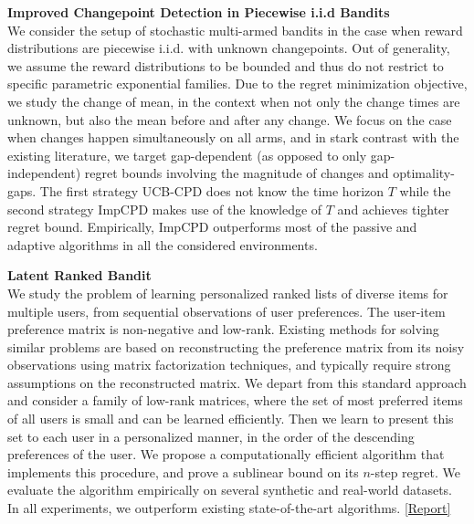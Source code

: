 \documentclass[margin,11pt]{res}
\begin{document}
\begin{resume}
\textbf{Improved Changepoint Detection in Piecewise i.i.d  Bandits}\\
We consider the setup of stochastic multi-armed bandits in the case when reward distributions are piecewise i.i.d. with unknown changepoints. Out of generality, we assume the reward distributions to be bounded and thus do not restrict to specific parametric exponential families. Due to the regret minimization objective, we study the change of mean, in the context when not only the change times are unknown, but also the mean before and after any change. We focus on the case when changes happen simultaneously on all arms, and in stark contrast with the existing literature, we target gap-dependent (as opposed to only gap-independent) regret bounds involving the magnitude of changes and optimality-gaps. The first strategy UCB-CPD does not know the time horizon $T$ while the second strategy ImpCPD makes use of the knowledge of $T$ and achieves tighter regret bound. Empirically, ImpCPD outperforms most of the passive and adaptive algorithms in all the considered environments.

%

\textbf{Latent Ranked Bandit}\\
We study the problem of learning personalized ranked lists of diverse items for multiple users, from sequential observations of user preferences. The user-item preference matrix is non-negative and low-rank. Existing methods for solving similar problems are based on reconstructing the preference matrix from its noisy observations using matrix factorization techniques, and typically require strong assumptions on the reconstructed matrix. We depart from this standard approach and consider a family of low-rank matrices, where the set of most preferred items of all users is small and can be learned efficiently. Then we learn to present this set to each user in a personalized manner, in the order of the descending preferences of the user. We propose a computationally efficient algorithm that implements this procedure, and prove a sublinear bound on its $n$-step regret. We evaluate the algorithm empirically on several synthetic and real-world datasets. In all experiments, we outperform existing state-of-the-art algorithms. \href{https://subhojyoti.github.io/pdf/paper.pdf}{[Report]}


\end{resume}
\end{document}
